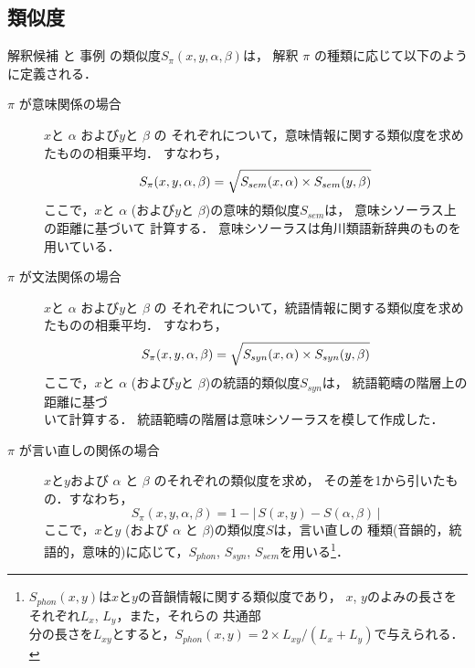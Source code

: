 \subsection{類似度}\label{sec:Corpus-based:Similarity}

解釈候補 \Formula{$\pi$}{\alpha,\beta} と
事例  の類似度$S_{\pi}(x,y,\alpha,\beta)$は，
解釈 $\pi$ の種類に応じて以下のように定義される．
\begin{description}
  \item[$\pi$ が意味関係の場合] $x$と $\alpha$ および$y$と $\beta$ の
それぞれについて，意味情報に関する類似度を求めたものの相乗平均．
すなわち，
\begin{equation}\label{eq:Sem}
  S_{\pi}(x,y,\alpha,\beta) =
\sqrt{\strut S_{sem}(x,\alpha) \times S_{sem}(y,\beta)}
\end{equation}
ここで，$x$と $\alpha$ (および$y$と $\beta$)の意味的類似度$S_{sem}$は，
意味シソーラス上の距離に基づいて
計算する\cite{Sumita:IEICE-E75-D-4-585}．
意味シソーラスは角川類語新辞典\cite{大野:角類新-81}のものを用いている．
  \item[$\pi$ が文法関係の場合] $x$と $\alpha$ および$y$と $\beta$ の
それぞれについて，統語情報に関する類似度を求めたものの相乗平均．
すなわち，
\begin{equation}\label{eq:Syn}
  S_{\pi}(x,y,\alpha,\beta) =
\sqrt{\strut S_{syn}(x,\alpha) \times S_{syn}(y,\beta)}
\end{equation}
ここで，$x$と $\alpha$ (および$y$と $\beta$)の統語的類似度$S_{syn}$は，
統語範疇の階層上の距離に基づ\\いて計算する．
統語範疇の階層は意味シソーラスを模して作成した．
  \item[$\pi$ が言い直しの関係の場合]
$x$と$y$および $\alpha$ と $\beta$ のそれぞれの類似度を求め，
その差を1から引いたもの．すなわち，
\begin{equation}\label{eq:Repair}
  S_{\pi}(x,y,\alpha,\beta) = 1 - |\,S(x,y) - S(\alpha,\beta)\,|
\end{equation}
ここで，$x$と$y$ (および $\alpha$ と $\beta$)の類似度$S$は，言い直しの
種類(音韻的，統語的，意味的)に応じて，$S_{phon}$, $S_{syn}$,
$S_{sem}$を用いる\footnote{
  $S_{phon}(x,y)$は$x$と$y$の音韻情報に関する類似度であり，
$x$, $y$のよみの長さをそれぞれ$L_{x}$, $L_{y}$，また，それらの
共通部\\分の長さを$L_{xy}$とすると，$S_{phon}(x,y) =
2 \times L_{xy}/(L_{x} + L_{y})$で与えられる．
}．
\end{description}

